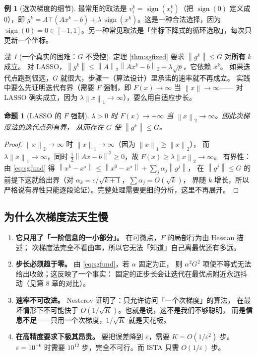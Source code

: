 \documentclass[11pt,a4paper,UTF8]{ctexart}
\theoremstyle{plain}
\newtheorem{proposition}[theorem]{命题}
\theoremstyle{definition}
\newtheorem{example}[theorem]{例}
\theoremstyle{remark}
\newtheorem{remark}[theorem]{注}
\newcommand{\norm}[1]{\left\lVert #1 \right\rVert}
\DeclareMathOperator{\sign}{sign}
\newcommand{\eps}{\varepsilon}
\begin{document}
\begin{example}[选次梯度的细节]
最常用的取法是 $v^k_i=\sign(x^k_i)$（把 $\sign(0)$ 定义成 $0$），即
$g^k=A\top(Ax^k-b)+\lambda\,\sign(x^k)$。这是一种合法选择，因为
$\sign(0)=0\in[-1,1]$。另一种常见取法是「坐标下降式的循环选取」，每次只更新一个坐标。
\end{example}

\begin{remark}[一个真实的困难：$G$ 不受控]
定理 \ref{thm:sgfixed} 要求 $\norm{g^k}\le G$ 对\textbf{所有} $k$ 成立。
对 LASSO，$\norm{g^k}\le\norm{A}_2\norm{Ax^k-b}_2+\lambda\sqrt p$，它依赖 $x^k$。
如果迭代点跑到很远，$G$ 就很大，步骤一（算法设计）里承诺的速率就不再成立。
实践中要么先证明迭代有界（需要 $F$ 强制，即 $F(x)\to\infty$ 当 $\norm x\to\infty$——
对 LASSO 确实成立，因为 $\lambda\norm x_1\to\infty$），要么用自适应步长。
\end{remark}

\begin{proposition}[LASSO 的 $F$ 强制]\label{prop:coercive}
$\lambda>0$ 时 $F(x)\to+\infty$ 当 $\norm x_2\to\infty$。因此次梯度法的迭代点列有界，
从而存在 $G$ 使 $\norm{g^k}\le G$。
\end{proposition}

\begin{proof}
$\norm x_2\to\infty$ 时 $\norm x_1\to\infty$（因为 $\norm x_1\ge\norm x_2$），
而 $\lambda\norm x_1\to\infty$，同时 $\tfrac12\norm{Ax-b}^2\ge0$，故 $F(x)\ge\lambda\norm x_2\to\infty$。
有界性：由 \eqref{eq:sgfund} 得 $\norm{x^k-x^\star}\le\norm{x^0-x^\star}+\sum_j\alpha_j\norm{g^j}$，
在 $\norm{g^j}\le G$ 的前提下这就给出界（对 $\alpha_k=c/\sqrt{k+1}$，$\sum\alpha_j=O(\sqrt k)$，
界随 $k$ 增长，所以严格说有界性只能逐段论证）。完整处理需要更细的分析，这里不再展开。
\end{proof}

\subsection{为什么次梯度法天生慢}

\begin{enumerate}
\item \textbf{它只用了「一阶信息的一小部分」。} 在可微点，$F$ 的局部行为由 Hessian 描述；
      次梯度法完全不看曲率，所以它无法「知道」自己离最优还有多远。
\item \textbf{步长必须趋于零。} 由 \eqref{eq:sgfund}，若 $\alpha$ 固定为正，
      则 $\alpha^2G^2$ 项使不等式无法给出收敛；这反映了一个事实：
      固定的正步长会让迭代在最优点附近永远抖动（见第 8 章的对比）。
\item \textbf{速率不可改进。} Nesterov 证明了：只允许访问「一个次梯度」的算法，
      在最坏情形下不可能快于 $O(1/\sqrt K)$。也就是说，这不是我们不够聪明，
      而是\textbf{信息不足}——只用一个次梯度，$1/\sqrt K$ 就是天花板。
\item \textbf{在高精度要求下极其昂贵。} 要把误差降到 $\eps$，需要 $K=O(1/\eps^2)$ 步。
      $\eps=10^{-6}$ 时需要 $10^{12}$ 步，完全不可行。而 ISTA 只需 $O(1/\eps)$ 步。
\end{enumerate}
\end{document}
